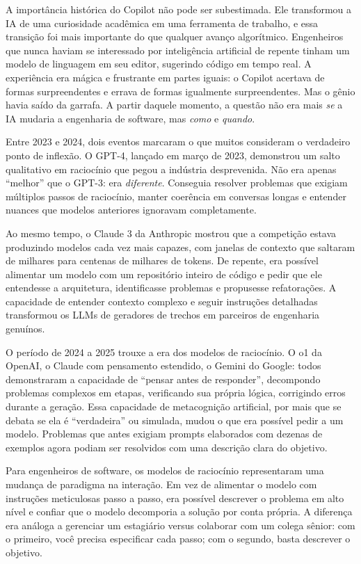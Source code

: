 A importância histórica do Copilot não pode ser subestimada. Ele
transformou a IA de uma curiosidade acadêmica em uma ferramenta de
trabalho, e essa transição foi mais importante do que qualquer avanço
algorítmico. Engenheiros que nunca haviam se interessado por inteligência
artificial de repente tinham um modelo de linguagem em seu editor,
sugerindo código em tempo real. A experiência era mágica e frustrante
em partes iguais: o Copilot acertava de formas surpreendentes e errava
de formas igualmente surpreendentes. Mas o gênio havia saído da garrafa.
A partir daquele momento, a questão não era mais \textit{se} a IA
mudaria a engenharia de software, mas \textit{como} e \textit{quando}.

Entre 2023 e 2024, dois eventos marcaram o que muitos consideram o
verdadeiro ponto de inflexão. O GPT-4, lançado em março de 2023,
demonstrou um salto qualitativo em raciocínio que pegou a indústria
desprevenida. Não era apenas ``melhor'' que o GPT-3: era
\textit{diferente}. Conseguia resolver problemas que exigiam múltiplos
passos de raciocínio, manter coerência em conversas longas e entender
nuances que modelos anteriores ignoravam completamente.

Ao mesmo tempo, o Claude 3 da Anthropic mostrou que a competição estava
produzindo modelos cada vez mais capazes, com janelas de contexto que
saltaram de milhares para centenas de milhares de tokens. De repente,
era possível alimentar um modelo com um repositório inteiro de código
e pedir que ele entendesse a arquitetura, identificasse problemas e
propusesse refatorações. A capacidade de entender contexto complexo e
seguir instruções detalhadas transformou os LLMs de geradores de
trechos em parceiros de engenharia genuínos.

O período de 2024 a 2025 trouxe a era dos modelos de raciocínio. O o1
da OpenAI, o Claude com pensamento estendido, o Gemini do Google:
todos demonstraram a capacidade de ``pensar antes de responder'',
decompondo problemas complexos em etapas, verificando sua própria
lógica, corrigindo erros durante a geração. Essa capacidade de
metacognição artificial, por mais que se debata se ela é
``verdadeira'' ou simulada, mudou o que era possível
pedir a um modelo. Problemas que antes exigiam prompts elaborados com
dezenas de exemplos agora podiam ser resolvidos com uma descrição clara
do objetivo.

Para engenheiros de software, os modelos de raciocínio representaram
uma mudança de paradigma na interação. Em vez de alimentar o modelo com
instruções meticulosas passo a passo, era possível descrever o problema
em alto nível e confiar que o modelo decomporia a solução por conta
própria. A diferença era análoga a gerenciar um estagiário versus
colaborar com um colega sênior: com o primeiro, você precisa especificar
cada passo; com o segundo, basta descrever o objetivo.

